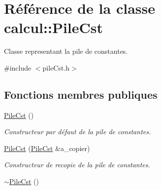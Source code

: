 \hypertarget{classcalcul_1_1_pile_cst}{\section{Référence de la classe calcul\-:\-:Pile\-Cst}
\label{classcalcul_1_1_pile_cst}
}


Classe representant la pile de constantes.  




{\ttfamily \#include $<$pile\-Cst.\-h$>$}

\subsection*{Fonctions membres publiques}
\begin{DoxyCompactItemize}
\item 
\hypertarget{classcalcul_1_1_pile_cst_abf48d20785e9a7318d4cbe94a3270bd2}{\hyperlink{classcalcul_1_1_pile_cst_abf48d20785e9a7318d4cbe94a3270bd2}{Pile\-Cst} ()}\label{classcalcul_1_1_pile_cst_abf48d20785e9a7318d4cbe94a3270bd2}

\begin{DoxyCompactList}\small\item\em Constructeur par défaut de la pile de constantes. \end{DoxyCompactList}\item 
\hyperlink{classcalcul_1_1_pile_cst_aa4896a49196236731d6b7fe9fe33dcb2}{Pile\-Cst} (\hyperlink{classcalcul_1_1_pile_cst}{Pile\-Cst} \&a\-\_\-copier)
\begin{DoxyCompactList}\small\item\em Constructeur de recopie de la pile de constantes. \end{DoxyCompactList}\item 
\hypertarget{classcalcul_1_1_pile_cst_a5c08e241bc25523978e672099093816f}{\hyperlink{classcalcul_1_1_pile_cst_a5c08e241bc25523978e672099093816f}{$\sim$\-Pile\-Cst} ()}\label{classcalcul_1_1_pile_cst_a5c08e241bc25523978e672099093816f}


\end{DoxyCompactItemize}
